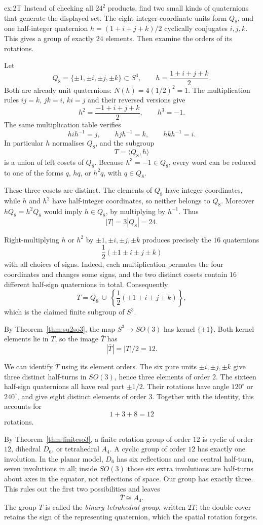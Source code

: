 \begin{solution}{ex:2T}
\idea Instead of checking all $24^2$ products, find two small kinds of quaternions that generate the displayed set. The eight integer-coordinate units form $Q_8$, and one half-integer quaternion $h=(1+i+j+k)/2$ cyclically conjugates $i,j,k$. This gives a group of exactly $24$ elements. Then examine the orders of its rotations.

\writeup Let
\[
Q_8=\{\pm1,\pm i,\pm j,\pm k\}\subset S^3,
\qquad h=\frac{1+i+j+k}{2}.
\]
Both are already unit quaternions: $N(h)=4(1/2)^2=1$. The multiplication rules $ij=k$, $jk=i$, $ki=j$ and their reversed versions give
\[
h^2=\frac{-1+i+j+k}{2},\qquad h^3=-1.
\]
The same multiplication table verifies
\[
hih^{-1}=j,\qquad hjh^{-1}=k,\qquad hkh^{-1}=i.
\]
In particular $h$ normalises $Q_8$, and the subgroup
\[
T=\langle Q_8,h\rangle
\]
is a union of left cosets of $Q_8$. Because $h^3=-1\in Q_8$, every word can be reduced to one of the forms $q$, $hq$, or $h^2q$, with $q\in Q_8$.

These three cosets are distinct. The elements of $Q_8$ have integer coordinates, while $h$ and $h^2$ have half-integer coordinates, so neither belongs to $Q_8$. Moreover $hQ_8=h^2Q_8$ would imply $h\in Q_8$, by multiplying by $h^{-1}$. Thus
\[
|T|=3|Q_8|=24.
\]

Right-multiplying $h$ or $h^2$ by $\pm1,\pm i,\pm j,\pm k$ produces precisely the $16$ quaternions
\[
\frac12(\pm1\pm i\pm j\pm k)
\]
with all choices of signs. Indeed, each multiplication permutes the four coordinates and changes some signs, and the two distinct cosets contain $16$ different half-sign quaternions in total. Consequently
\[
T=Q_8\ \cup\
\left\{\frac12(\pm1\pm i\pm j\pm k)\right\},
\]
which is the claimed finite subgroup of $S^3$.

By Theorem~\ref{thm:su2so3}, the map $S^3\to SO(3)$ has kernel $\{\pm1\}$. Both kernel elements lie in $T$, so the image $\bar T$ has
\[
|\bar T|=|T|/2=12.
\]

We can identify $\bar T$ using its element orders. The six pure units $\pm i,\pm j,\pm k$ give three distinct half-turns in $SO(3)$, hence three elements of order $2$. The sixteen half-sign quaternions all have real part $\pm1/2$. Their rotations have angle $120^\circ$ or $240^\circ$, and give eight distinct elements of order $3$. Together with the identity, this accounts for
\[
1+3+8=12
\]
rotations.

By Theorem~\ref{thm:finiteso3}, a finite rotation group of order $12$ is cyclic of order $12$, dihedral $D_6$, or tetrahedral $A_4$. A cyclic group of order $12$ has exactly one involution. In the planar model, $D_6$ has six reflections and one central half-turn, seven involutions in all; inside $SO(3)$ those six extra involutions are half-turns about axes in the equator, not reflections of space. Our group has exactly three. This rules out the first two possibilities and leaves
\[
\boxed{\bar T\cong A_4}.
\]
The group $T$ is called the \emph{binary tetrahedral group}, written $2T$; the double cover retains the sign of the representing quaternion, which the spatial rotation forgets.
\end{solution}

